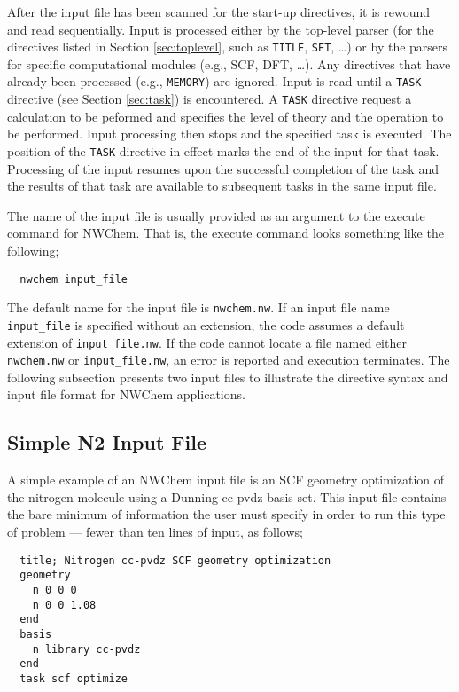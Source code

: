 After the input file has been scanned for the start-up directives, it
is rewound and read sequentially.  Input is processed either by the
top-level parser (for the directives listed in Section
\ref{sec:toplevel}, such as \verb+TITLE+, \verb+SET+, \ldots) or by
the parsers for specific computational modules (e.g., SCF, DFT,
\ldots).  Any directives that have already been processed (e.g.,
\verb+MEMORY+) are ignored.  Input is read until a \verb+TASK+
directive (see Section \ref{sec:task}) is encountered.  A \verb+TASK+
directive request a calculation to be peformed and specifies the level
of theory and the operation to be performed.  Input processing then
stops and the specified task is executed.  The position of the
\verb+TASK+ directive in effect marks the end of the input for that
task.  Processing of the input resumes upon the successful completion
of the task and the results of that task are available to subsequent
tasks in the same input file.

The name of the input file is usually provided as an argument to the
execute command for NWChem.  That is, the execute command looks
something like the following;

\begin{verbatim}
  nwchem input_file
\end{verbatim}

The default name for the input file is \verb+nwchem.nw+.  If an input
file name \verb+input_file+ is specified without an extension, the code
assumes a default extension of \verb+input_file.nw+.  If the code cannot
locate a file named either \verb+nwchem.nw+ or \verb+input_file.nw+, an 
error is reported and execution terminates.  The following
subsection presents two input files to illustrate the directive syntax and 
input file format for NWChem applications.

\subsection{Simple N2 Input File}
\label{sec:simplesample}

A simple example of an NWChem input file is an SCF geometry optimization of
the nitrogen molecule using a Dunning cc-pvdz basis set.  This input
file contains the bare minimum of information the user must specify in
order to run this type of problem --- fewer than ten lines of input,
as follows;
\begin{verbatim}
  title; Nitrogen cc-pvdz SCF geometry optimization
  geometry  
    n 0 0 0
    n 0 0 1.08
  end
  basis
    n library cc-pvdz
  end
  task scf optimize
\end{verbatim}

